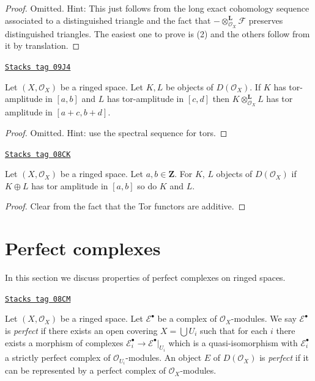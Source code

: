 \begin{proof}
Omitted. Hint: This just follows from the long exact cohomology sequence
associated to a distinguished triangle and the fact that
$- \otimes_{\mathcal{O}_X}^{\mathbf{L}} \mathcal{F}$
preserves distinguished triangles.
The easiest one to prove is (2) and the others follow from it by
translation.
\end{proof}

\begin{lemma}
\label{cohomology-lemma-tensor-tor-amplitude}
\href{https://stacks.math.columbia.edu/tag/09J4}{\texttt{Stacks tag 09J4}}

Let $(X, \mathcal{O}_X)$ be a ringed space. Let $K, L$ be objects of
$D(\mathcal{O}_X)$. If $K$ has tor-amplitude in $[a, b]$ and
$L$ has tor-amplitude in $[c, d]$ then $K \otimes_{\mathcal{O}_X}^\mathbf{L} L$
has tor amplitude in $[a + c, b + d]$.
\end{lemma}

\begin{proof}
Omitted. Hint: use the spectral sequence for tors.
\end{proof}

\begin{lemma}
\label{cohomology-lemma-summands-tor-amplitude}
\href{https://stacks.math.columbia.edu/tag/08CK}{\texttt{Stacks tag 08CK}}

Let $(X, \mathcal{O}_X)$ be a ringed space. Let $a, b \in \mathbf{Z}$.
For $K$, $L$ objects of $D(\mathcal{O}_X)$ if $K \oplus L$ has tor
amplitude in $[a, b]$ so do $K$ and $L$.
\end{lemma}

\begin{proof}
Clear from the fact that the Tor functors are additive.
\end{proof}

\section{Perfect complexes}
\label{cohomology-section-perfect}
In this section we discuss properties of perfect complexes on
ringed spaces.

\begin{definition}[Perfect]
\label{cohomology-definition-perfect}
\href{https://stacks.math.columbia.edu/tag/08CM}{\texttt{Stacks tag 08CM}}

Let $(X, \mathcal{O}_X)$ be a ringed space.
Let $\mathcal{E}^\bullet$ be a complex of $\mathcal{O}_X$-modules.
We say $\mathcal{E}^\bullet$ is {\it perfect} if there exists
an open covering $X = \bigcup U_i$ such that for each $i$
there exists a morphism of complexes
$\mathcal{E}_i^\bullet \to \mathcal{E}^\bullet|_{U_i}$
which is a quasi-isomorphism with $\mathcal{E}_i^\bullet$
a strictly perfect complex of $\mathcal{O}_{U_i}$-modules.
An object $E$ of $D(\mathcal{O}_X)$ is {\it perfect}
if it can be represented by a perfect complex of $\mathcal{O}_X$-modules.
\end{definition}

